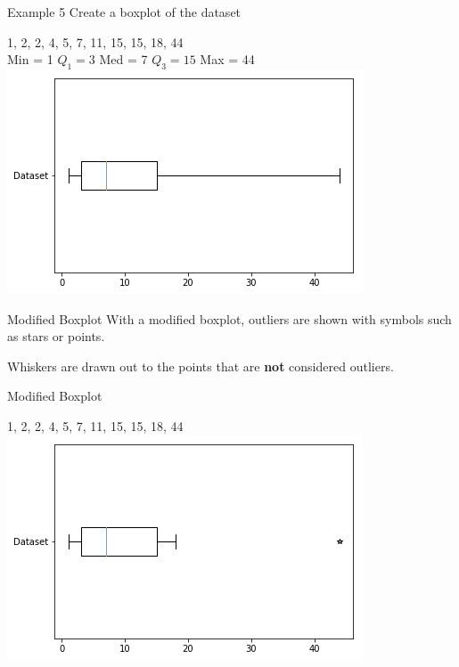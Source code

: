 \documentclass[t]{beamer}
\begin{document}
\begin{frame}{Example 5}
Create a boxplot of the dataset
\begin{center}
1, 2, 2, 4, 5, 7, 11, 15, 15, 18, 44
\newline\\ \pause
Min = 1 \quad $Q_1 = 3$ \quad Med = 7 \quad $Q_3 = 15$ \quad Max = 44
\newline\\	\pause
\includegraphics[scale=0.5]{../Images/boxplot.png}
\end{center}
\end{frame}

\begin{frame}{Modified Boxplot}
With a modified boxplot, outliers are shown with symbols such as stars or points. \newline\\	\pause

Whiskers are drawn out to the points that are {\color{blue}\textbf{not}} considered outliers.	
\end{frame}

\begin{frame}{Modified Boxplot}
\begin{center}
1, 2, 2, 4, 5, 7, 11, 15, 15, 18, 44	\newline\\
\includegraphics[scale=0.5]{../Images/modified_boxplot.png}
\end{center}
\end{frame}
\end{document}
